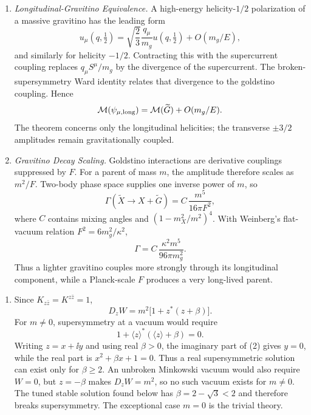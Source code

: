 \begin{enumerate}
  \begin{enumerate}
    \item \emph{Longitudinal-Gravitino Equivalence.}
    A high-energy helicity-\(1/2\) polarization of a massive gravitino has
      the leading form
      \[
        u_\mu(q,\tfrac12)
          =\sqrt{\frac23}\frac{q_\mu}{m_g}u(q,\tfrac12)
           +O(m_g/E),
      \]
      and similarly for helicity \(-1/2\).  Contracting this with the
      supercurrent coupling replaces \(q_\mu S^\mu/m_g\) by the divergence
      of the supercurrent.  The broken-supersymmetry Ward identity relates
      that divergence to the goldstino coupling.  Hence
      \[
        \mathcal M(\psi_{\mu,\rm long})
          =\mathcal M(\widetilde G)+O(m_g/E).
      \]
      The theorem concerns only the longitudinal helicities; the transverse
      \(\pm3/2\) amplitudes remain gravitationally coupled.
    \item \emph{Gravitino Decay Scaling.}
    Goldstino interactions are derivative couplings suppressed by \(F\).
      For a parent of mass \(m\), the amplitude therefore scales as
      \(m^2/F\).  Two-body phase space supplies one inverse power of \(m\),
      so
      \[
        \Gamma(\widetilde X\to X+\widetilde G)
          =C\,\frac{m^5}{16\pi F^2},
      \]
      where \(C\) contains mixing angles and
      \((1-m_X^2/m^2)^4\).  With Weinberg's flat-vacuum relation
      \(F^2=6m_g^2/\kappa^2\),
      \[
        \Gamma
          =C\,\frac{\kappa^2m^5}{96\pi m_g^2}.
      \]
      Thus a lighter gravitino couples more strongly through its
      longitudinal component, while a Planck-scale \(F\) produces a very
      long-lived parent.
  \end{enumerate}

  \begin{enumerate}
    \item Since \(K_{z\bar z}=K^{z\bar z}=1\),
      \[
        D_zW=m^2\bigl[1+z^*(z+\beta)\bigr].
      \tag{1}
      \]
      For \(m\ne0\), supersymmetry at a vacuum would require
      \[
        1+\langle z\rangle^*(\langle z\rangle+\beta)=0.
      \tag{2}
      \]
      Writing \(z=x+\ii y\) and using real \(\beta>0\), the imaginary part of
      (2) gives \(y=0\), while the real part is
      \(x^2+\beta x+1=0\).  Thus a real supersymmetric solution can exist
      only for \(\beta\geq2\).  An unbroken Minkowski vacuum would also
      require \(W=0\), but \(z=-\beta\) makes
      \(D_zW=m^2\), so no such vacuum exists for \(m\ne0\).  The tuned
      stable solution found below has \(\beta=2-\sqrt3<2\) and therefore
      breaks supersymmetry.  The exceptional case \(m=0\) is the trivial
      theory.


\end{enumerate}
\end{enumerate}
